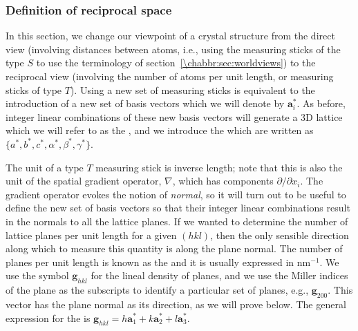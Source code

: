 \subsubsection{Definition of reciprocal space}
In this section, we change our viewpoint of a crystal structure from the direct view (involving distances between atoms, i.e., using the measuring sticks of the type $S$ to use the terminology of section~\ref{\chabbr:sec:worldviews}) to the reciprocal view (involving the number of atoms per unit length, or measuring sticks of type $T$).  Using a new set of measuring sticks is equivalent to the introduction of a new set of basis vectors which we will denote by $\mathbf{a}^{\ast}_i$. As before, integer linear combinations of these new basis vectors will generate a 3D lattice which we will refer to as the , and we introduce the  which are written as $\{a^{\ast},b^{\ast},c^{\ast},\alpha^{\ast},\beta^{\ast},\gamma^{\ast}\}$.

The unit of a type $T$ measuring stick is inverse length; note that this is also the unit of the spatial gradient operator, $\nabla$, which has components $\partial/\partial x_i$.  The gradient operator evokes the notion of \textit{normal}, so it will turn out to be useful to define the new set of basis vectors so that their integer linear combinations result in the normals to all the lattice planes. If we wanted to determine the number of lattice planes per unit length for a given $(hkl)$, then the only sensible direction along which to measure this quantity is along the plane normal.  The number of planes per unit length is known as the  and it is usually expressed in nm$^{-1}$.   We use the symbol $\mathbf{g}_{hkl}$ for the lineal density of planes, and we use the Miller indices of the plane as the subscripts to identify a particular set of planes, e.g., $\mathbf{g}_{200}$.  This vector has the plane normal as its direction, as we will prove below.  The general expression for the  is $\mathbf{g}_{hkl}=h\mathbf{a}^{\ast}_1+k\mathbf{a}^{\ast}_2+l\mathbf{a}^{\ast}_3$.

